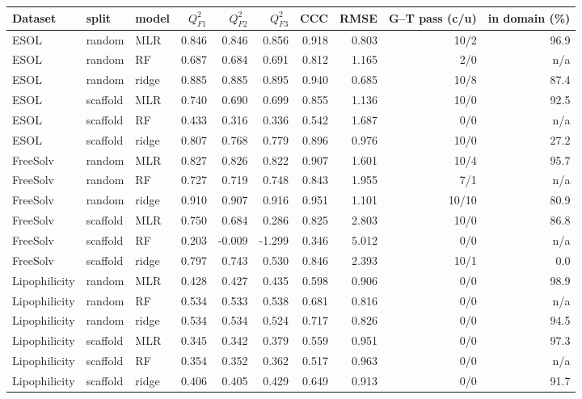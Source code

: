 \begin{tabular}{lllrrrrrrr}
\toprule
Dataset & split & model & $Q^2_{F1}$ & $Q^2_{F2}$ & $Q^2_{F3}$ & CCC & RMSE & G--T pass (c/u) & in domain (\%) \\
\midrule
ESOL & random & MLR & 0.846 & 0.846 & 0.856 & 0.918 & 0.803 & 10/2 & 96.9 \\
ESOL & random & RF & 0.687 & 0.684 & 0.691 & 0.812 & 1.165 & 2/0 & n/a \\
ESOL & random & ridge & 0.885 & 0.885 & 0.895 & 0.940 & 0.685 & 10/8 & 87.4 \\
ESOL & scaffold & MLR & 0.740 & 0.690 & 0.699 & 0.855 & 1.136 & 10/0 & 92.5 \\
ESOL & scaffold & RF & 0.433 & 0.316 & 0.336 & 0.542 & 1.687 & 0/0 & n/a \\
ESOL & scaffold & ridge & 0.807 & 0.768 & 0.779 & 0.896 & 0.976 & 10/0 & 27.2 \\
FreeSolv & random & MLR & 0.827 & 0.826 & 0.822 & 0.907 & 1.601 & 10/4 & 95.7 \\
FreeSolv & random & RF & 0.727 & 0.719 & 0.748 & 0.843 & 1.955 & 7/1 & n/a \\
FreeSolv & random & ridge & 0.910 & 0.907 & 0.916 & 0.951 & 1.101 & 10/10 & 80.9 \\
FreeSolv & scaffold & MLR & 0.750 & 0.684 & 0.286 & 0.825 & 2.803 & 10/0 & 86.8 \\
FreeSolv & scaffold & RF & 0.203 & -0.009 & -1.299 & 0.346 & 5.012 & 0/0 & n/a \\
FreeSolv & scaffold & ridge & 0.797 & 0.743 & 0.530 & 0.846 & 2.393 & 10/1 & 0.0 \\
Lipophilicity & random & MLR & 0.428 & 0.427 & 0.435 & 0.598 & 0.906 & 0/0 & 98.9 \\
Lipophilicity & random & RF & 0.534 & 0.533 & 0.538 & 0.681 & 0.816 & 0/0 & n/a \\
Lipophilicity & random & ridge & 0.534 & 0.534 & 0.524 & 0.717 & 0.826 & 0/0 & 94.5 \\
Lipophilicity & scaffold & MLR & 0.345 & 0.342 & 0.379 & 0.559 & 0.951 & 0/0 & 97.3 \\
Lipophilicity & scaffold & RF & 0.354 & 0.352 & 0.362 & 0.517 & 0.963 & 0/0 & n/a \\
Lipophilicity & scaffold & ridge & 0.406 & 0.405 & 0.429 & 0.649 & 0.913 & 0/0 & 91.7 \\
\bottomrule
\end{tabular}
